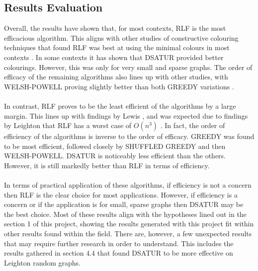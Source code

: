\subsection{Results Evaluation}

Overall, the results have shown that, for most contexts, RLF is the most efficacious algorithm. This aligns with other studies of constructive colouring techniques that found RLF was best at using the minimal colours in most contexts \cite{LewisR.M.R2015AGtG, Leighton1979AGC, MuratNurdan}. In some contexts it has shown that DSATUR provided better colourings. However, this was only for very small and sparse graphs. The order of efficacy of the remaining algorithms also lines up with other studies, with WELSH-POWELL proving slightly better than both GREEDY variations \cite{MuratNurdan}.  
\\\\
In contrast, RLF proves to be the least efficient of the algorithms by a large margin. This lines up with findings by Lewis \cite{LewisR.M.R2015AGtG}, and was expected due to findings by Leighton that RLF has a worst case of $O(n^3)$ \cite{Leighton1979AGC}. In fact, the order of efficiency of the algorithms is inverse to the order of efficacy. GREEDY was found to be most efficient, followed closely by SHUFFLED GREEDY and then WELSH-POWELL. DSATUR is noticeably less efficient than the others. However, it is still markedly better than RLF in terms of efficiency. 
\\\\
In terms of practical application of these algorithms, if efficiency is not a concern then RLF is the clear choice for most applications. However, if efficiency is a concern or if the application is for small, sparse graphs then DSATUR may be the best choice. Most of these results align with the hypotheses lined out in the section 1 of this project, showing the results generated with this project fit within other results found within the field. There are, however, a few unexpected results that may require further research in order to understand. This includes the results gathered in section 4.4 that found DSATUR to be more effective on Leighton random graphs.  